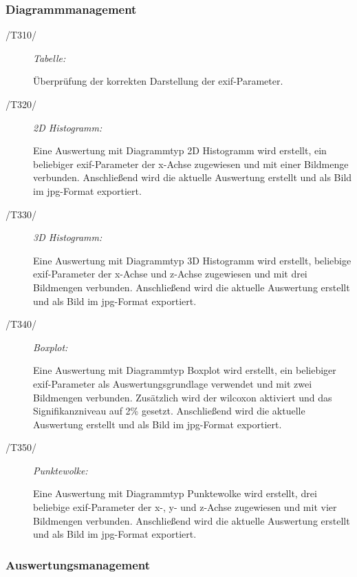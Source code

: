 	\subsubsection{Diagrammmanagement}
	
		\begin{description}
			
			\item[/T310/] \textit{Tabelle:}\par Überprüfung der korrekten Darstellung der \gls{exif}-Parameter. 

			\item[/T320/] \textit{2D Histogramm:}\par	Eine Auswertung mit Diagrammtyp 2D Histogramm wird erstellt, ein beliebiger \gls{exif}-Parameter der x-Achse zugewiesen und mit einer Bildmenge verbunden. Anschließend wird die aktuelle Auswertung erstellt und als Bild im \gls{jpg}-Format exportiert.
		
			\item[/T330/] \textit{3D Histogramm:}\par Eine Auswertung mit Diagrammtyp 3D Histogramm wird erstellt, beliebige \gls{exif}-Parameter der x-Achse und z-Achse zugewiesen und mit drei Bildmengen verbunden. Anschließend wird die aktuelle Auswertung erstellt und als Bild im \gls{jpg}-Format exportiert.

			\item[/T340/] \textit{Boxplot:}\par Eine Auswertung mit Diagrammtyp Boxplot wird erstellt, ein beliebiger \gls{exif}-Parameter als Auswertungsgrundlage verwendet und mit zwei Bildmengen verbunden. Zusätzlich wird der \gls{wilcoxon} aktiviert und das Signifikanzniveau auf 2\% gesetzt. Anschließend wird die aktuelle Auswertung erstellt und als Bild im \gls{jpg}-Format exportiert.

			\item[/T350/] \textit{Punktewolke:}\par	Eine Auswertung mit Diagrammtyp Punktewolke wird erstellt, drei beliebige \gls{exif}-Parameter der x-, y- und z-Achse zugewiesen und mit vier Bildmengen verbunden. Anschließend wird die aktuelle Auswertung erstellt und als Bild im \gls{jpg}-Format exportiert.

		\end{description}
	
	\subsubsection{Auswertungsmanagement}


